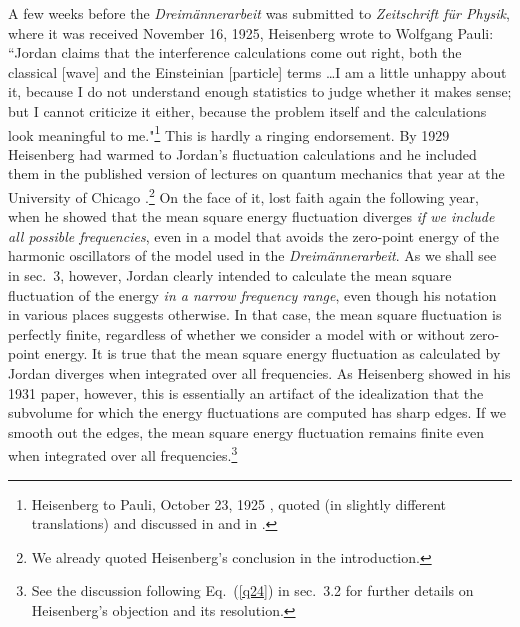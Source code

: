 \documentclass{elsart}
\begin{document}
A few weeks before the {\it Dreim\"annerarbeit} was submitted to {\it Zeitschrift f\"ur Physik}, where it was received November 16, 1925, Heisenberg wrote to Wolfgang Pauli: ``Jordan claims that the interference calculations come out right, both the classical [wave] and the Einsteinian [particle] terms \ldots I am a little unhappy about it, because I do not understand enough statistics to judge whether it makes sense; but I cannot criticize it either, because the problem itself and the calculations look  meaningful to me."\footnote{Heisenberg to Pauli, October 23, 1925  \citep[p.\ 252]{Pauli 1979}, quoted (in slightly different translations) and discussed in \citep[p.\ 220]{Darrigol 1986} and in \citep[Vol.\ 3, p.\ 149]{Mehra Rechenberg}.} This is hardly a ringing endorsement. By 1929 Heisenberg had warmed to Jordan's fluctuation calculations and he included them in the published version of lectures on quantum mechanics that year at the University of Chicago \citep[Ch.\ V, sec.\ 7]{Heisenberg 1930}.\footnote{We already quoted Heisenberg's conclusion in the introduction.} On the face of it, \citet{Heisenberg 1931} lost faith again the following year, when he showed that  the mean square energy fluctuation diverges {\it if we include all possible frequencies}, even in a model that avoids the zero-point energy of the harmonic oscillators of the model used in the {\it Dreim\"annerarbeit}. As we shall see in sec.\ 3, however, Jordan clearly intended to calculate the mean square fluctuation of the energy {\it in a narrow frequency range}, even though his notation in various places suggests otherwise. In that case, the mean square fluctuation is perfectly finite, regardless of whether we consider a model with or without zero-point energy. It is true that the mean square energy fluctuation as calculated by Jordan diverges when integrated over all frequencies. As Heisenberg showed in his 1931 paper, however, this is essentially an artifact of the idealization that the subvolume for which the energy fluctuations are computed has sharp edges. If we smooth out the edges, the mean square energy fluctuation remains finite even when integrated over all frequencies.\footnote{See the discussion following Eq.\ (\ref{q24}) in sec.\ 3.2 for further details on Heisenberg's objection and its resolution.}
\end{document}
